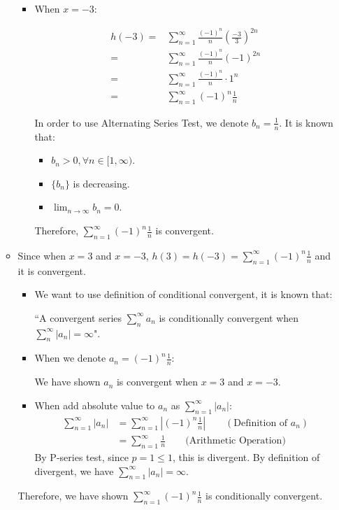 \documentclass[12pt]{exam}
\begin{document}
\begin{enumerate}
\begin{itemize}
\begin{itemize}
		\item When $x = -3$:

		\begin{align*}
			h(-3)
			=& \sum_{n = 1}^{\infty} \frac{(-1)^n}{n}({\frac{-3}{3}})^{2n}\\
			=& \sum_{n = 1}^{\infty} \frac{(-1)^n}{n}(-1)^{2n} \\
			=& \sum_{n = 1}^{\infty} \frac{(-1)^n}{n}\cdot1^n \\
			=& \sum_{n = 1}^{\infty} (-1)^n\frac{1}{n}
		\end{align*}

		In order to use Alternating Series Test, we denote $b_n = \frac{1}{n}$. It is known that:
		\begin{itemize}
			\item $b_n > 0, \forall n\in[1, \infty)$.
			\item $\{b_n\}$ is decreasing.
			\item $\lim_{n \to \infty} b_n = 0$.
		\end{itemize}
		

		Therefore, $\sum_{n = 1}^{\infty} (-1)^n \frac{1}{n}$ is convergent.
	\end{itemize}
	\item Since when $x = 3$ and $x=-3$, $h(3)=h(-3)=\sum_{n = 1}^{\infty} (-1)^n\frac{1}{n}$ and it is convergent.
	\begin{itemize}
	    \item We want to use definition of conditional convergent, it is known that:
	    
	        ``A convergent series $\sum_{n}^\infty a_n$ is conditionally convergent when $\sum_{n}^\infty |a_n|=\infty$".
	    
	    \item When we denote $a_n=(-1)^n\frac{1}{n}$:
	    
            We have shown $a_n$ is convergent when $x=3$ and $x=-3$.
        
        \item When add absolute value to $a_n$ as $\sum_{n=1}^\infty |a_n|$:
        \begin{align*}
            \sum_{n=1}^\infty |a_n|
            &=\sum_{n=1}^\infty |(-1)^n\frac{1}{n}| \qquad(\mbox{Definition of } a_n)\\
            &=\sum_{n=1}^\infty \frac{1}{n} \qquad\mbox{(Arithmetic Operation)}
        \end{align*}
        By P-series test, since $p=1 \leq 1$, this is divergent. By definition of divergent, we have $\sum_{n=1}^\infty |a_n|=\infty$.
	\end{itemize}
	Therefore, we have shown $\sum_{n = 1}^{\infty} (-1)^n\frac{1}{n}$ is conditionally convergent.
\end{itemize}


\end{enumerate}
\end{document}
